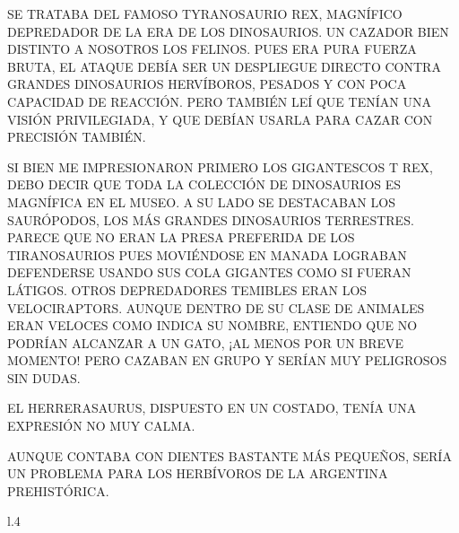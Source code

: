 SE TRATABA DEL FAMOSO TYRANOSAURIO REX, MAGNÍFICO DEPREDADOR DE LA ERA DE LOS DINOSAURIOS. UN CAZADOR BIEN DISTINTO A NOSOTROS LOS FELINOS. PUES ERA PURA FUERZA BRUTA, EL ATAQUE DEBÍA SER UN DESPLIEGUE DIRECTO CONTRA GRANDES DINOSAURIOS HERVÍBOROS, PESADOS Y CON POCA CAPACIDAD DE REACCIÓN. PERO TAMBIÉN LEÍ QUE TENÍAN UNA VISIÓN PRIVILEGIADA, Y QUE DEBÍAN USARLA PARA CAZAR CON PRECISIÓN TAMBIÉN.

\newpage
{}

SI BIEN ME IMPRESIONARON PRIMERO LOS GIGANTESCOS T REX, DEBO DECIR QUE TODA LA COLECCIÓN DE DINOSAURIOS ES MAGNÍFICA EN EL MUSEO. A SU LADO SE DESTACABAN LOS SAURÓPODOS, LOS MÁS GRANDES DINOSAURIOS TERRESTRES. PARECE QUE NO ERAN LA PRESA PREFERIDA DE LOS TIRANOSAURIOS PUES MOVIÉNDOSE EN MANADA LOGRABAN DEFENDERSE USANDO SUS COLA GIGANTES COMO SI FUERAN LÁTIGOS. OTROS DEPREDADORES TEMIBLES ERAN LOS  VELOCIRAPTORS. AUNQUE DENTRO DE SU CLASE DE ANIMALES ERAN VELOCES COMO INDICA SU NOMBRE, ENTIENDO QUE NO PODRÍAN ALCANZAR A UN GATO, ¡AL MENOS POR UN BREVE MOMENTO! PERO CAZABAN EN GRUPO Y SERÍAN MUY PELIGROSOS SIN DUDAS.

EL HERRERASAURUS, DISPUESTO EN UN COSTADO, TENÍA UNA EXPRESIÓN NO MUY CALMA. 

\newpage
{}



AUNQUE CONTABA CON DIENTES BASTANTE MÁS PEQUEÑOS, SERÍA UN PROBLEMA PARA LOS HERBÍVOROS DE LA ARGENTINA PREHISTÓRICA. 

\begin{wrapfigure} [7]{l}{.4\textwidth} 
\end{wrapfigure}
	

